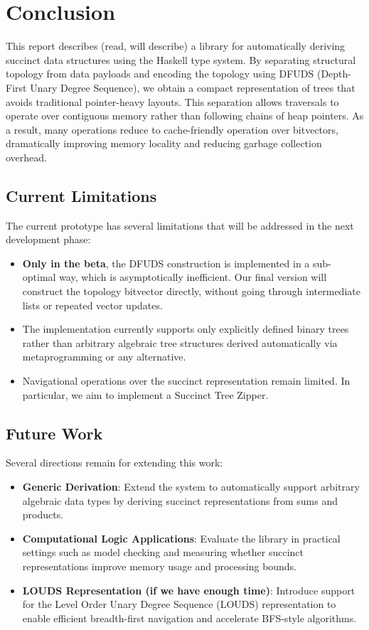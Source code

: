 \section{Conclusion}

This report describes (read, will describe) a library for automatically deriving succinct data structures using the Haskell type system. By separating structural topology from data payloads and encoding the topology using DFUDS (Depth-First Unary Degree Sequence), we obtain a compact representation of trees that avoids traditional pointer-heavy layouts. This separation allows traversals to operate over contiguous memory rather than following chains of heap pointers. As a result, many operations reduce to cache-friendly operation over bitvectors, dramatically improving memory locality and reducing garbage collection overhead.

\subsection{Current Limitations}
The current prototype has several limitations that will be addressed in the next development phase:
\begin{itemize}
  \item \textbf{Only in the beta}, the DFUDS construction is implemented in a sub-optimal way, which is asymptotically inefficient. Our final version will construct the topology bitvector directly, without going through intermediate lists or repeated vector updates.
  \item The implementation currently supports only explicitly defined binary trees rather than arbitrary algebraic tree structures derived automatically via metaprogramming or any alternative.

  \item Navigational operations over the succinct representation remain limited. In particular, we aim to implement a Succinct Tree Zipper.
\end{itemize}

\subsection{Future Work}
Several directions remain for extending this work:
\begin{itemize}
  \item \textbf{Generic Derivation}: Extend the system to automatically support arbitrary algebraic data types by deriving succinct representations from sums and products.

  \item \textbf{Computational Logic Applications}: Evaluate the library in practical settings such as model checking and measuring whether succinct representations improve memory usage and processing bounds.

  \item \textbf{LOUDS Representation (if we have enough time)}: Introduce support for the Level Order Unary Degree Sequence (LOUDS) representation to enable efficient breadth-first navigation and accelerate BFS-style algorithms.
\end{itemize}